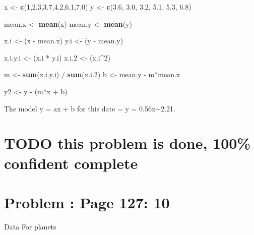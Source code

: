\documentclass[]{article}
\newenvironment{Shaded}{\begin{snugshade}}{\end{snugshade}}
\newcommand{\KeywordTok}[1]{\textcolor[rgb]{0.13,0.29,0.53}{\textbf{{#1}}}}
\newcommand{\DecValTok}[1]{\textcolor[rgb]{0.00,0.00,0.81}{{#1}}}
\newcommand{\FloatTok}[1]{\textcolor[rgb]{0.00,0.00,0.81}{{#1}}}
\newcommand{\StringTok}[1]{\textcolor[rgb]{0.31,0.60,0.02}{{#1}}}
\newcommand{\NormalTok}[1]{{#1}}
\begin{document}
\begin{Shaded}
\begin{Highlighting}[]
\NormalTok{x <-}\StringTok{ }\KeywordTok{c}\NormalTok{(}\DecValTok{1}\NormalTok{,}\FloatTok{2.3}\NormalTok{,}\FloatTok{3.7}\NormalTok{,}\FloatTok{4.2}\NormalTok{,}\FloatTok{6.1}\NormalTok{,}\FloatTok{7.0}\NormalTok{)}
\NormalTok{y <-}\StringTok{ }\KeywordTok{c}\NormalTok{(}\FloatTok{3.6}\NormalTok{, }\FloatTok{3.0}\NormalTok{, }\FloatTok{3.2}\NormalTok{, }\FloatTok{5.1}\NormalTok{, }\FloatTok{5.3}\NormalTok{, }\FloatTok{6.8}\NormalTok{)}

\NormalTok{mean.x <-}\StringTok{ }\KeywordTok{mean}\NormalTok{(x)}
\NormalTok{mean.y <-}\StringTok{ }\KeywordTok{mean}\NormalTok{(y)}

\NormalTok{x.i <-}\StringTok{ }\NormalTok{(x -}\StringTok{ }\NormalTok{mean.x)}
\NormalTok{y.i <-}\StringTok{ }\NormalTok{(y -}\StringTok{ }\NormalTok{mean.y)}

\NormalTok{x.i.y.i <-}\StringTok{ }\NormalTok{(x.i *}\StringTok{ }\NormalTok{y.i)}
\NormalTok{x.i}\FloatTok{.2}   \NormalTok{<-}\StringTok{ }\NormalTok{(x.i^}\DecValTok{2}\NormalTok{)}

\NormalTok{m <-}\StringTok{ }\KeywordTok{sum}\NormalTok{(x.i.y.i) /}\StringTok{ }\KeywordTok{sum}\NormalTok{(x.i}\FloatTok{.2}\NormalTok{)}
\NormalTok{b <-}\StringTok{ }\NormalTok{mean.y -}\StringTok{ }\NormalTok{m*mean.x}

\NormalTok{y2 <-}\StringTok{ }\NormalTok{y -}\StringTok{ }\NormalTok{(m*x +}\StringTok{ }\NormalTok{b)}
\end{Highlighting}
\end{Shaded}

The model y = ax + b for this date = y = 0.56x+2.21.

\section{TODO this problem is done, 100\% confident
complete}\label{todo-this-problem-is-done-100-confident-complete}

\section{Problem : Page 127: 10}\label{problem-page-127-10}

Data For planets
\end{document}
